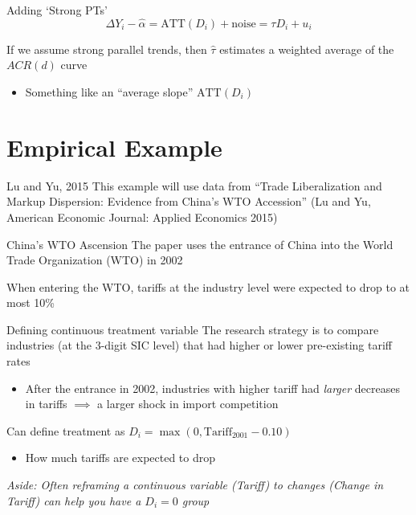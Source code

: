 \documentclass[aspectratio=169,t]{beamer}
\begin{document}
\begin{frame}{Adding `Strong PTs'}
  $$
    \Delta Y_i - \hat{\alpha} = \text{ATT}(D_i) + \text{noise} = \tau D_i + u_i
  $$

  If we assume strong parallel trends, then $\hat{\tau}$ estimates a weighted average of the $ACR(d)$ curve
  \begin{itemize}
    \item Something like an ``average slope'' $\text{ATT}(D_i)$ 
  \end{itemize}
\end{frame}



\section{Empirical Example}

\begin{frame}{Lu and Yu, 2015}
  This example will use data from
  ``Trade Liberalization and Markup Dispersion: Evidence from China's WTO Accession'' (Lu and Yu, American Economic Journal: Applied Economics 2015)
\end{frame}

\begin{frame}{China's WTO Ascension}
  The paper uses the entrance of China into the World Trade Organization (WTO) in 2002

  \bigskip
  When entering the WTO, tariffs at the industry level were expected to drop to at most 10\%
\end{frame}

\begin{frame}{Defining continuous treatment variable}
  The research strategy is to compare industries (at the 3-digit SIC level) that had higher or lower pre-existing tariff rates

  \begin{itemize}
    \item After the entrance in 2002, industries with higher tariff had \emph{larger} decreases in tariffs $\implies$ a larger shock in import competition
  \end{itemize}

  \bigskip
  Can define treatment as
  $D_i = \max (0, \text{Tariff}_{2001} - 0.10)$
  \begin{itemize}
    \item How much tariffs are expected to drop
  \end{itemize}

  \emph{Aside: Often reframing a continuous variable (Tariff) to changes (Change in Tariff) can help you have a $D_i = 0$ group}
\end{frame}
\end{document}
